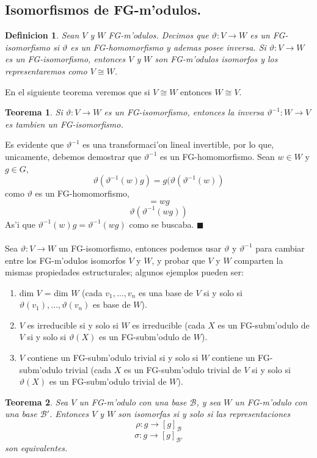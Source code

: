 \documentclass[a4paper,openright,12pt]{book}
\numberwithin{equation}{section} %
\newtheorem{teorema}{Teorema}[section] %
\newtheorem{definicion}{Definicion}[section] %
\newenvironment{proof}{\noindent{\it Demostracion:}}{\hfill$\blacksquare$} %
\begin{document}
\subsection{Isomorfismos de FG-m'odulos.}
\begin{definicion}
Sean $V$ y $W$ FG-m'odulos. Decimos que $\vartheta : V \rightarrow W$ es un FG-isomorfismo si $\vartheta$ es un FG-homomorfismo y ademas posee inversa. Si $\vartheta : V \rightarrow W$ es un FG-isomorfismo, entonces $V$ y $W$ son FG-m'odulos isomorfos y los representaremos como $V \cong W$.
\end{definicion}
En el siguiente teorema veremos que si $V \cong W$ entonces $W \cong V$.
\begin{teorema}
Si $\vartheta : V \rightarrow W$ es un FG-isomorfismo, entonces la inversa $\vartheta^{-1} : W \rightarrow V$ es tambien un FG-isomorfismo.
\end{teorema}
\begin{proof}
Es evidente que $\vartheta^{-1}$ es una transformaci'on lineal invertible, por lo que, unicamente, debemos demostrar que $\vartheta^{-1}$ es un FG-homomorfismo. Sean $w \in W$ y $g \in G$,
\[
\vartheta(\vartheta^{-1}(w)g)=g(\vartheta(\vartheta^{-1}(w))
\]
como $\vartheta$ es un FG-homomorfismo,
\[
=wg
\]
\[
\vartheta(\vartheta^{-1}(wg))
\]
As'i que $\vartheta^{-1}(w)g=\vartheta^{-1}(wg)$ como se buscaba.
\end{proof}\\
\\
Sea $\vartheta : V \rightarrow W$ un FG-isomorfismo, entonces podemos usar $\vartheta$ y $\vartheta^{-1}$ para cambiar entre los FG-m'odulos isomorfos $V$ y $W$, y probar que $V$ y $W$ comparten la mismas propiedades estructurales; algunos ejemplos pueden ser:
\begin{enumerate}
\item dim $V$ = dim $W$ (cada $v_{1}, \ldots ,v_{n} $ es una base de $V$ si y solo si $\vartheta (v_{1}), \ldots ,\vartheta (v_{n})$ es base de $W$).
\item $V$ es irreducible si y solo si $W$ es irreducible (cada $X$  es un FG-subm'odulo de $V$ si y solo si $\vartheta (X)$ es un FG-subm'odulo de $W$).
\item $V$ contiene un FG-subm'odulo trivial si y solo si $W$ contiene un FG-subm'odulo trivial (cada $X$ es un FG-subm'odulo trivial de $V$ si y solo si $\vartheta (X)$ es un FG-subm'odulo trivial de $W$).
\end{enumerate}
\begin{teorema}
Sea $V$ un FG-m'odulo con una base $\mathscr{B}$, y sea $W$ un FG-m'odulo con una base $\mathscr{B'}$. Entonces $V$ y $W$ son isomorfas si y solo si las representaciones
\[
\rho : g \rightarrow [g]_{\mathscr{B}}
\]
\[
\sigma : g \rightarrow [g]_{\mathscr{B'}}
\]
son equivalentes.
\end{teorema}
\end{document}
